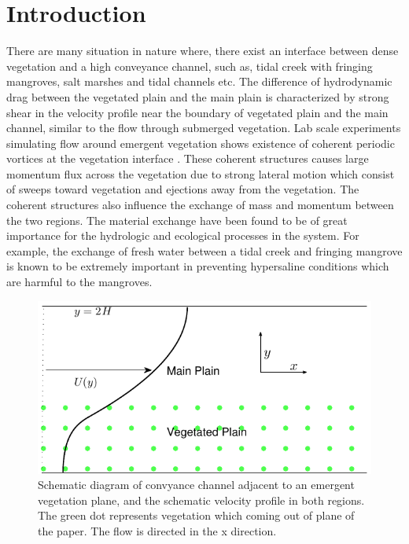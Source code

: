 \documentclass[12pt]{report}   %
\begin{document}
\section{Introduction}
There are many situation in nature where, there exist an interface between dense vegetation and a high conveyance channel, such as, tidal creek with fringing mangroves, salt marshes and tidal channels etc. The difference of hydrodynamic drag between the vegetated plain and the main plain is characterized by strong shear in the velocity profile near the boundary of vegetated plain and the main channel, similar to the flow through submerged vegetation. Lab scale experiments simulating flow around emergent vegetation shows existence of coherent periodic vortices at the vegetation interface \cite{White07}. These coherent structures causes large momentum flux across the vegetation due to strong lateral motion which consist of sweeps toward vegetation and ejections away from the vegetation. The coherent structures also influence the exchange of mass and momentum between the two regions. The material exchange have been found to be of great importance for the hydrologic and ecological processes in the system. For 
example, the exchange of fresh water between a tidal creek and fringing mangrove is known to be extremely important in preventing hypersaline conditions which are harmful to the mangroves.  

\begin{figure}
\centerline{\includegraphics{GrassBaseIsotropicDrag}}
\caption{Schematic diagram of convyance channel adjacent to an emergent vegetation plane, and the schematic velocity profile in both regions. The green dot represents vegetation which coming out of plane of the paper. The flow is directed in the x direction.}
\label{IsotropicSchematic}
\end{figure}
\end{document}

